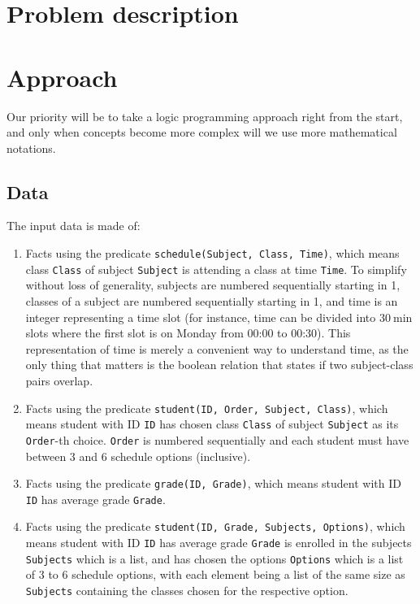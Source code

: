 \documentclass[runningheads]{llncs}
\begin{document}
\section{Problem description}

\section{Approach}

Our priority will be to take a logic programming approach right from the start, and only when concepts become more complex will we use more mathematical notations.

\subsection{Data}

The input data is made of:
\begin{enumerate}
    \item Facts using the predicate \texttt{schedule(Subject, Class, Time)}, which means class \texttt{Class} of subject \texttt{Subject} is attending a class at time \texttt{Time}. To simplify without loss of generality, subjects are numbered sequentially starting in 1, classes of a subject are numbered sequentially starting in 1, and time is an integer representing a time slot (for instance, time can be divided into $\SI{30}{\minute}$ slots where the first slot is on Monday from 00:00 to 00:30). This representation of time is merely a convenient way to understand time, as the only thing that matters is the boolean relation that states if two subject-class pairs overlap.
    \item Facts using the predicate \texttt{student(ID, Order, Subject, Class)}, which means student with ID \texttt{ID} has chosen class \texttt{Class} of subject \texttt{Subject} as its \texttt{Order}-th choice. \texttt{Order} is numbered sequentially and each student must have between 3 and 6 schedule options (inclusive).
    \item Facts using the predicate \texttt{grade(ID, Grade)}, which means student with ID \texttt{ID} has average grade \texttt{Grade}.
    \item Facts using the predicate \texttt{student(ID, Grade, Subjects, Options)}, which means student with ID \texttt{ID} has average grade \texttt{Grade} is enrolled in the subjects \texttt{Subjects} which is a list, and has chosen the options  \texttt{Options} which is a list of 3 to 6 schedule options, with each element being a list of the same size as \texttt{Subjects} containing the classes chosen for the respective option.
\end{enumerate}
\end{document}
